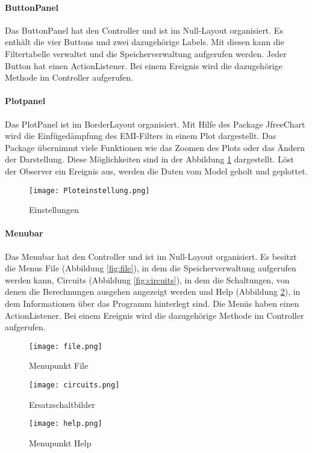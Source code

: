 \newpage

\paragraph{ButtonPanel} \label{par:buttonpanel}

Das ButtonPanel hat den Controller und ist im Null-Layout organisiert. Es enthält die vier Buttons und zwei dazugehörige Labels. Mit diesen kann die Filtertabelle verwaltet und die Speicherverwaltung aufgerufen werden. Jeder Button hat einen ActionListener. Bei einem Ereignis wird die dazugehörige Methode im Controller  aufgerufen.
\bigskip

\paragraph{Plotpanel} \label{par:plotpanel}

Das PlotPanel ist im BorderLayout organisiert. Mit Hilfe des Package JfreeChart \cite{jfreechart} wird die Einfügedämpfung des EMI-Filters in einem Plot dargestellt. Das Package übernimmt viele Funktionen wie das Zoomen des Plots oder das Ändern der Darstellung. Diese Möglichkeiten sind in der Abbildung \ref{fig:einstellung} dargestellt. Löst der Observer ein Ereignis aus, werden die Daten vom Model geholt und geplottet.

\begin{figure}[H]
	\centering
	\texttt{[image: Ploteinstellung.png]}
	\caption{Einstellungen}
	\label{fig:einstellung}
\end{figure} 

\bigskip
\newpage

\paragraph{Menubar} \label{par:menu}

Das Menubar hat den Controller und ist im Null-Layout organisiert. Es besitzt die Menus File (Abbildung \ref{fig:file}), in dem die Speicherverwaltung aufgerufen werden kann, Circuits (Abbildung \ref{fig:circuits}), in dem die Schaltungen, von denen die Berechnungen ausgehen angezeigt werden und Help (Abbildung \ref{fig:help}), in dem Informationen über das Programm hinterlegt sind. Die Menüs haben einen ActionListener. Bei einem Ereignis wird die dazugehörige Methode im Controller  aufgerufen.

\begin{figure}[H]
	\centering
	\begin{minipage}{0.3\linewidth}
		\centering
		\texttt{[image: file.png]}
		\caption{Menupunkt File}
		\label{fig:file}
	\end{minipage}
    	\begin{minipage}{0.3\linewidth}
	\centering
		\texttt{[image: circuits.png]}
		\caption{Ersatzschaltbilder}
		\label{fig:circuits}
	\end{minipage}
        \begin{minipage}{0.3\linewidth}
    \centering
		\texttt{[image: help.png]}
		\caption{Menupunkt Help}
		\label{fig:help}
    \end{minipage}  
\end{figure}

\newpage

